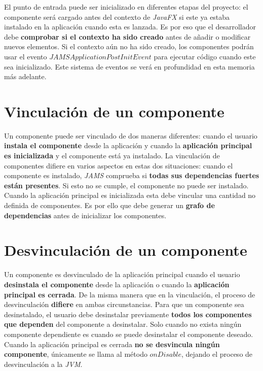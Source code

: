  El punto de entrada puede ser inicializado en diferentes
etapas del proyecto: el componente será cargado antes del contexto
de \textit{JavaFX} si este ya estaba instalado en la aplicación
cuando esta es lanzada.
Es por eso que el desarrollador debe \textbf{comprobar si el contexto ha sido creado}
antes de añadir o modificar nuevos elementos.
Si el contexto aún no ha sido creado, los componentes podrán
usar el evento $JAMSApplicationPostInitEvent$ para ejecutar
código cuando este sea inicializado.
Este sistema de eventos se verá en profundidad en esta memoria más adelante.


\section{Vinculación de un componente}\label{sec:vinculacion-de-un-componente}

Un componente puede ser vinculado de dos maneras diferentes:
cuando el usuario \textbf{instala el componente} desde la aplicación
y cuando la \textbf{aplicación principal es inicializada} y el componente
está ya instalado.
La vinculación de componentes difiere en varios aspectos en estas
dos situaciones: cuando el componente es instalado, \textit{JAMS}
comprueba si \textbf{todas sus dependencias fuertes están presentes}.
Si esto no se cumple, el componente no puede ser instalado.
Cuando la aplicación principal es inicializada esta debe vincular
una cantidad no definida de componentes.
Es por ello que debe generar un \textbf{grafo de dependencias}
antes de inicializar los componentes.

\section{Desvinculación de un componente}\label{sec:desvinculacion-de-un-componente}

Un componente es desvinculado de la aplicación principal
cuando el usuario \textbf{desinstala el componente} desde
la aplicación o cuando la \textbf{aplicación principal es cerrada}.
De la misma manera que en la vinculación, el proceso de
desvinculación \textbf{difiere} en ambas circunstancias.
Para que un componente sea desinstalado, el usuario
debe desinstalar previamente \textbf{todos los componentes
que dependen} del componente a desinstalar.
Solo cuando no exista ningún componente dependiente
es cuando se puede desinstalar el componente deseado.
Cuando la aplicación principal es cerrada
\textbf{no se desvincula ningún componente},
únicamente se llama al método $onDisable$, dejando
el proceso de desvinculación a la \textit{JVM}.

